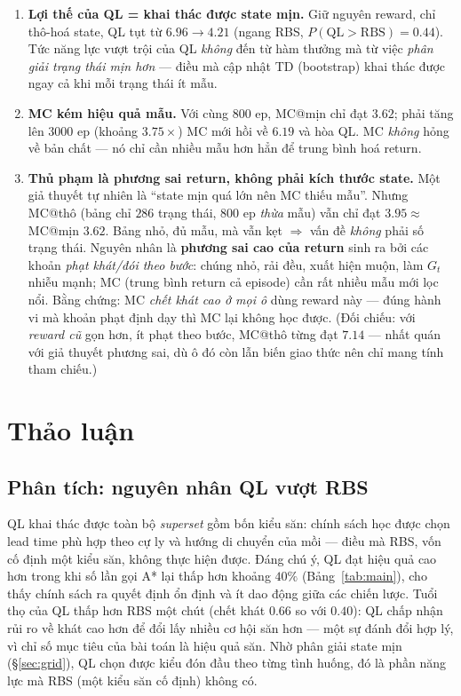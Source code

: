 \documentclass[11pt,a4paper]{article}
\begin{document}
\begin{enumerate}[leftmargin=1.6em,itemsep=2pt]
  \item \textbf{Lợi thế của QL = khai thác được state mịn.} Giữ nguyên reward, chỉ thô-hoá state,
        QL tụt từ $6.96 \to 4.21$ (ngang RBS, $P(\text{QL}>\text{RBS})=0.44$). Tức năng lực vượt
        trội của QL \emph{không} đến từ hàm thưởng mà từ việc \emph{phân giải trạng thái mịn hơn}
        --- điều mà cập nhật TD (bootstrap) khai thác được ngay cả khi mỗi trạng thái ít mẫu.
  \item \textbf{MC kém hiệu quả mẫu.} Với cùng $800$ ep, MC@mịn chỉ đạt $3.62$; phải tăng lên
        $3000$ ep (khoảng $3.75\times$) MC mới hồi về $6.19$ và hòa QL. MC \emph{không} hỏng về bản
        chất --- nó chỉ cần nhiều mẫu hơn hẳn để trung bình hoá return.
  \item \textbf{Thủ phạm là phương sai return, không phải kích thước state.} Một giả thuyết tự
        nhiên là ``state mịn quá lớn nên MC thiếu mẫu''. Nhưng MC@thô (bảng chỉ $286$ trạng thái,
        $800$ ep \emph{thừa} mẫu) vẫn chỉ đạt $3.95 \approx$ MC@mịn $3.62$. Bảng nhỏ, đủ mẫu, mà vẫn
        kẹt $\Rightarrow$ vấn đề \emph{không} phải số trạng thái. Nguyên nhân là \textbf{phương sai
        cao của return} sinh ra bởi các khoản \emph{phạt khát/đói theo bước}: chúng nhỏ, rải đều,
        xuất hiện muộn, làm $G_t$ nhiễu mạnh; MC (trung bình return cả episode) cần rất nhiều mẫu
        mới lọc nổi. Bằng chứng: MC \emph{chết khát cao ở mọi ô} dùng reward này --- đúng hành vi mà
        khoản phạt định dạy thì MC lại không học được. (Đối chiếu: với \emph{reward cũ} gọn hơn,
        ít phạt theo bước, MC@thô từng đạt $7.14$ --- nhất quán với giả thuyết phương sai, dù ô đó
        còn lẫn biến giao thức nên chỉ mang tính tham chiếu.)
\end{enumerate}

\section{Thảo luận}\label{sec:disc}

\subsection{Phân tích: nguyên nhân QL vượt RBS}
QL khai thác được toàn bộ \emph{superset} gồm bốn kiểu săn: chính sách học được chọn lead time phù
hợp theo cự ly và hướng di chuyển của mồi --- điều mà RBS, vốn cố định một kiểu săn, không thực
hiện được. Đáng chú ý, QL đạt hiệu quả cao hơn trong khi số lần gọi A* lại thấp hơn khoảng $40\%$
(Bảng~\ref{tab:main}), cho thấy chính sách ra quyết định ổn định và ít dao động giữa các chiến
lược. Tuổi thọ của QL thấp hơn RBS một chút (chết khát $0.66$ so với $0.40$): QL chấp nhận rủi ro
về khát cao hơn để đổi lấy nhiều cơ hội săn hơn --- một sự đánh đổi hợp lý, vì chỉ số mục tiêu của
bài toán là hiệu quả săn. Nhờ phân giải state mịn (\S\ref{sec:grid}), QL chọn được kiểu đón đầu theo
từng tình huống, đó là phần năng lực mà RBS (một kiểu săn cố định) không có.
\end{document}
